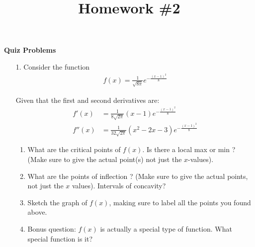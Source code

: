 \documentclass[11pt,reqno]{article}
\title{Homework \#2}
\theoremstyle{definition}
\begin{document}
	\centerline{\textbf{\Large{Quiz Problems}}}
	
	\vspace{0.2in}
	
	\begin{enumerate}
	\item[1.] Consider the function
	\begin{align*}
		f(x) = \frac{1}{\sqrt{8 \pi}} e^{- \frac{(x - 1)^2}{8}}
	\end{align*}
	
	Given that the first and second derivatives are:
	\begin{align*}
		f'(x) &= \frac{1}{8 \sqrt{2 \pi}} (x - 1) e^{- \frac{(x - 1)^2}{8}} \\
		f''(x) &= \frac{1}{32 \sqrt{2 \pi}} (x^2 - 2x - 3) e^{- \frac{(x - 1)^2}{8}}
	\end{align*}
	
	\begin{enumerate}
		\item What are the critical points of $f(x)$. Is there a local max or min ? (Make sure to give the actual point(s) not just the $x$-values). 
		\item What are the points of inflection ? (Make sure to give the actual points, not just the $x$ values). Intervals of concavity? 
		\item Sketch the graph of $f(x)$, making sure to label all the points you found above. 
		\item Bonus question: $f(x)$ is actually a special type of function. What special function is it? 
		

\end{enumerate}
\end{enumerate}
\end{document}
